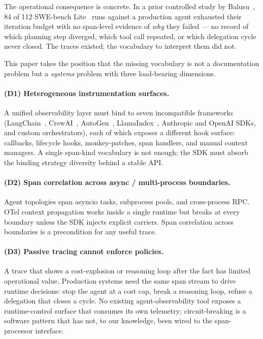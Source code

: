 \documentclass[sigplan,10pt,anonymous,review]{acmart}
\begin{document}
The operational consequence is concrete. In a prior controlled study by
Balusu~\cite{aiware2026}, 84 of 112 SWE-bench
Lite~\cite{swebench} runs against a production agent exhausted their
iteration budget with no span-level evidence of \emph{why} they
failed --- no record of which planning step diverged, which tool call
repeated, or which delegation cycle never closed. The traces existed;
the vocabulary to interpret them did not.

This paper takes the position that the missing vocabulary is not a
documentation problem but a \emph{systems} problem with three
load-bearing dimensions.

\paragraph{(D1) Heterogeneous instrumentation surfaces.}
A unified observability layer must bind to seven incompatible frameworks
(LangChain~\cite{langchain}, CrewAI~\cite{crewai},
AutoGen~\cite{autogen}, LlamaIndex~\cite{llamaindex}, Anthropic and
OpenAI SDKs, and custom orchestrators), each of which exposes a
different hook surface: callbacks, lifecycle hooks, monkey-patches,
span handlers, and manual context managers. A single span-kind
vocabulary is not enough; the SDK must absorb the binding strategy
diversity behind a stable API.

\paragraph{(D2) Span correlation across async / multi-process
boundaries.} Agent topologies span asyncio tasks, subprocess pools, and
cross-process RPC. OTel context propagation works inside a single
runtime but breaks at every boundary unless the SDK injects explicit
carriers. Span correlation across boundaries is a precondition for any
useful trace.

\paragraph{(D3) Passive tracing cannot enforce policies.} A trace that
shows a cost-explosion or reasoning loop after the fact has limited
operational value. Production systems need the same span stream to drive
runtime decisions: stop the agent at a cost cap, break a reasoning
loop, refuse a delegation that closes a cycle. No existing
agent-observability tool exposes a runtime-control surface that consumes
its own telemetry; circuit-breaking is a software pattern
\cite{circuit_breaker_pattern} that has not, to our knowledge, been
wired to the span-processor interface.
\end{document}
